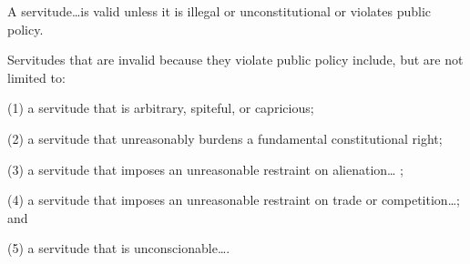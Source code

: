 

A servitude\ldots is valid unless it is illegal or unconstitutional or violates
public policy.

Servitudes that are invalid because they violate public policy include, but are
not limited to:
\begin{statute}
\item (1) a servitude that is arbitrary, spiteful, or capricious;

\item (2) a servitude that unreasonably burdens a fundamental constitutional
right;

\item (3) a servitude that imposes an unreasonable restraint on alienation\ldots
;

\item (4) a servitude that imposes an unreasonable restraint on trade or
competition\ldots ; and

(5) a servitude that is unconscionable\ldots .

\end{statute}

